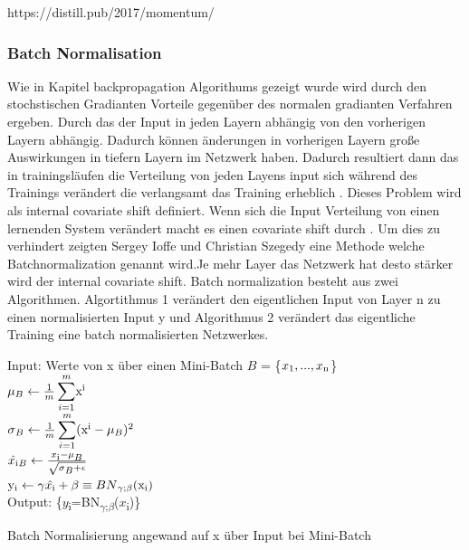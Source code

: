 \documentclass{llncs}
\begin{document}
https://distill.pub/2017/momentum/

\subsubsection{Batch Normalisation}

Wie in Kapitel backpropagation Algorithums gezeigt wurde wird durch den stochstischen Gradianten Vorteile gegenüber des normalen gradianten Verfahren ergeben. Durch das der Input in jeden Layern abhängig von den vorherigen Layern abhängig. Dadurch können änderungen in vorherigen Layern große Auswirkungen in tiefern Layern im Netzwerk haben.
Dadurch resultiert dann das in trainingsläufen die Verteilung von jeden Layens input sich während des Trainings verändert die verlangsamt das Training erheblich \cite{batchnorm}. Dieses Problem wird als internal covariate shift definiert. Wenn sich die Input Verteilung von einen lernenden System verändert macht es einen covariate shift durch \cite{batchnorm}. 
Um dies zu verhindert zeigten Sergey Ioffe und Christian Szegedy \cite{batchnorm} eine Methode welche Batchnormalization genannt wird.Je mehr Layer das Netzwerk hat desto stärker wird der internal covariate shift. Batch normalization besteht aus zwei Algorithmen. Algortithmus 1 verändert den eigentlichen Input von Layer n zu einen normalisierten Input y und Algorithmus 2 verändert das eigentliche Training eine batch normalisierten Netzwerkes.

\begin{algorithm}[H]
Input: Werte von x über einen Mini-Batch $B$ = \{$x\textsubscript{1},...,x\textsubscript{n}$\}\\
\begin{math}
\mu\textsubscript{$B$}\leftarrow\frac{1}{m}\displaystyle\sum_{i=1}^{m}$x$\textsuperscript{i}
\end{math}\\
\begin{math}
\sigma\textsubscript{$B$}\leftarrow\frac{1}{m}\displaystyle\sum_{i=1}^{m}($x$\textsuperscript{i} - \mu\textsubscript{$B$})\textsuperscript{2}
\end{math}\\
\begin{math}
\hat{x\textsubscript{i}}\textsubscript{$B$}\leftarrow\frac{x\textsubscript{i}-\mu\textsubscript{$B$}}{\sqrt{\sigma\textsubscript{$B$} + \epsilon}}
\end{math}\\
\begin{math}
$y$\textsubscript{i}\leftarrow\gamma\hat{x\textsubscript{i}} + \beta \equiv BN\textsubscript{$\gamma$;$\beta$}($x$\textsubscript{i})
\end{math}\\
Output: \{$y$\textsubscript{i}=BN\textsubscript{$\gamma$;$\beta$}($x$\textsubscript{i})\}
\caption{Batch Normalisierung angewand auf x über Input bei Mini-Batch  }	
\end{algorithm}
\end{document}
